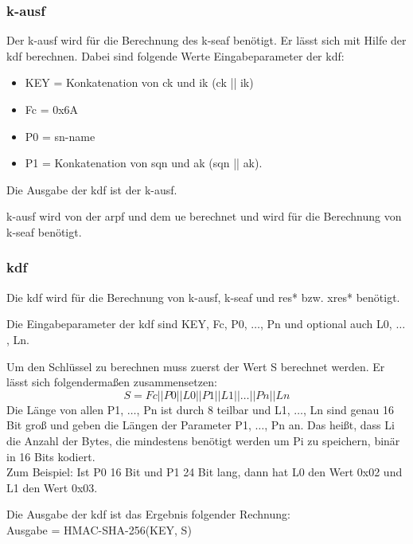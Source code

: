 \subsubsection{\gls{k-ausf}}
Der \gls{k-ausf} wird für die Berechnung des \gls{k-seaf} benötigt.
Er lässt sich mit Hilfe der \gls{kdf} berechnen.
Dabei sind folgende Werte Eingabeparameter der \gls{kdf}: %
\begin{itemize}
\item KEY = Konkatenation von \gls{ck} und \gls{ik} (\gls{ck} || \gls{ik})
\item Fc = 0x6A
\item P0 = \gls{sn-name}
\item P1 = Konkatenation von \gls{sqn} und \gls{ak} (\gls{sqn} || \gls{ak}).
\end{itemize}
Die Ausgabe der \gls{kdf} ist der \gls{k-ausf}.

\gls{k-ausf} wird von der \gls{arpf} und dem \gls{ue} berechnet und wird für die Berechnung von \gls{k-seaf} benötigt.

\subsubsection{\gls{kdf}}
Die \gls{kdf} wird für die Berechnung von \gls{k-ausf}, \gls{k-seaf} und \gls{res*} bzw. \gls{xres*} benötigt.

Die Eingabeparameter der \gls{kdf} sind KEY, Fc, P0, $ \dots $, Pn und optional auch L0, $ \dots $, Ln.

Um den Schlüssel zu berechnen muss zuerst der Wert S berechnet werden. %
Er l\"asst sich folgendermaßen zusammensetzen: 
\begin{equation*}
S = Fc || P0 || L0 || P1 || L1 || \dots || Pn || Ln 
\end{equation*}
Die Länge von allen P1, $ \dots $, Pn ist durch 8 teilbar und L1, $ \dots $, Ln sind genau 16 Bit groß und geben die Längen der Parameter P1, $ \dots $, Pn an. 
Das heißt, dass Li die Anzahl der Bytes, die mindestens benötigt werden um Pi zu speichern, binär in 16 Bits kodiert. \\
Zum Beispiel: Ist P0 16 Bit und P1 24 Bit lang, dann hat L0 den Wert 0x02 und L1 den Wert 0x03.

Die Ausgabe der \gls{kdf} ist das Ergebnis folgender Rechnung: \\
Ausgabe = HMAC-SHA-256(KEY, S) \\

